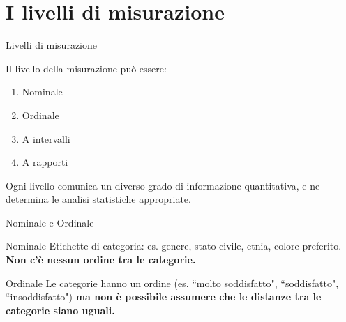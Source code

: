 \documentclass{beamer}
\begin{document}
\section{I livelli di misurazione}
\begin{frame}{Livelli di misurazione}
  \begin{block}{Il livello della misurazione può essere:}
    \begin{enumerate}
      \item Nominale
      \item Ordinale
      \item A intervalli
      \item A rapporti
    \end{enumerate}
 \end{block}
Ogni livello comunica un diverso grado di informazione quantitativa, e ne determina le analisi statistiche appropriate.
\end{frame}

\begin{frame}{Nominale e Ordinale}
\begin{block}{Nominale}
    Etichette di categoria: es. genere, stato civile, etnia, colore preferito. \textbf{Non c'è nessun ordine tra le categorie.}
\end{block}
\pause
\begin{block}{Ordinale}
    Le categorie hanno un ordine (es. “molto soddisfatto", “soddisfatto", “insoddisfatto") \textbf{ma non è possibile assumere che le distanze tra le categorie siano uguali.} \\
    \pause
    \centering
    \vspace{0.5em}
\end{block}
\end{frame}
\end{document}
